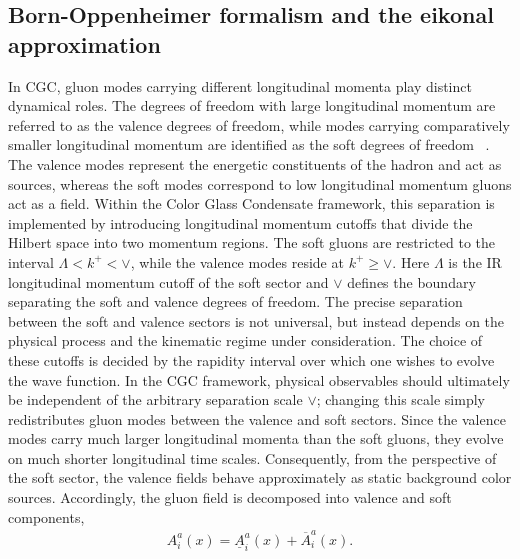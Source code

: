 \documentclass[a4paper,11pt]{article}
\begin{document}
\subsection{Born-Oppenheimer formalism and the eikonal approximation}\label{sec:Eikonalapprox}
In CGC, gluon modes carrying different longitudinal momenta play distinct dynamical roles. The degrees of freedom with large longitudinal momentum are referred to as the valence degrees of freedom, while modes carrying comparatively smaller longitudinal momentum are identified as the soft degrees of freedom ~\cite{McLerran:1993ni,McLerran:1993ka}. The valence modes represent the energetic constituents of the hadron and act as sources, whereas the soft modes correspond to low longitudinal momentum gluons act as a field. Within the Color Glass Condensate framework, this separation is implemented by introducing longitudinal momentum cutoffs that divide the Hilbert space into two momentum regions. The soft gluons are restricted to the interval $\Lambda<k^{+}<\vee$, while the valence modes reside at $k^{+}\geq \vee$. Here $\Lambda$ is the IR longitudinal momentum cutoff of the soft sector and $\vee$ defines the boundary separating the soft and valence degrees of freedom. The precise separation between the soft and valence sectors is not universal, but instead depends on the physical process and the kinematic regime under consideration. The choice of these cutoffs is decided by the rapidity interval over which one wishes to evolve the wave function. In the CGC framework, physical observables should ultimately be independent of the arbitrary separation scale $\vee$; changing this scale simply redistributes gluon modes between the valence and soft sectors. Since the valence modes carry much larger longitudinal momenta than the soft gluons, they evolve on much shorter longitudinal time scales. Consequently, from the perspective of the soft sector, the valence fields behave approximately as static background color sources.
Accordingly, the gluon field is decomposed into valence and soft components,
\begin{align} \label{eq:decompose}
    A_{i}^{a}(x)=\underline{A}_{i}^{a}(x)+\overline{A}_{i}^{a}(x).
\end{align}
\end{document}
